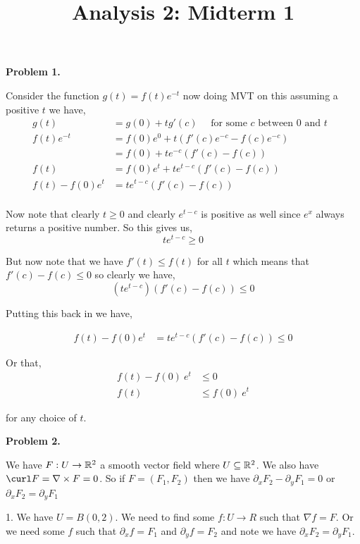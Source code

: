 \documentclass[a4paper]{article}
\title{Analysis 2: Midterm 1}
\begin{document}
\maketitle
\textbf{Problem 1.}

Consider the function $g(t) = f(t) e^{-t}$ now doing MVT on this assuming a positive $t$ we have,
\begin{align*}
    g(t) &= g(0) + t g'(c) \quad \text{ for some $c$ between $0$ and $t$ }\\
    f(t) e^{-t} &=  f(0) e^{0} + t (f'(c) e^{-c} - f(c) e^{-c})\\
 &= f(0) + t e^{-c} (f'(c) - f(c)) \\
 f(t) &= f(0)e^{t} + t e^{t-c} (f'(c) - f(c)) \\
 f(t)  -  f(0)e^{t}  &= t e^{t-c} (f'(c) - f(c)) \\
\end{align*}

Now note that clearly $t \ge 0$  and clearly $e^{t - c}$ is positive as well since $e^{x}$ always returns a positive number. So this gives us, 
\[
    t e^{t - c} \ge 0
\]

But now note that we have $f'(t) \le f(t)$ for all $t$ which means that $f'(c) - f(c) \le 0$ so clearly we have, 
\[
    (te^{t - c})(f'(c) - f(c)) \le 0
\]

Putting this back in we have, 

\begin{align*}
 f(t)  -  f(0)e^{t}  &= t e^{t-c} (f'(c) - f(c)) \le 0
\end{align*}

Or that, 
\begin{align*}
    f(t) - f(0) \ e^{t} &\le 0\\
    f(t) &\le f(0)\ e^{t}
\end{align*}

for any choice of $t$.


\textbf{Problem 2.}

We have $F:U \to \mathbb{R}^2$ a smooth vector field where $U \subseteq \mathbb{R}^2$. We also have $\curl F = \nabla \times F = 0$. So if $F= (F_{1}, F_{2})$ then we have $\partial_x F_{2} - \partial_y F_{1} = 0$ or $\partial_x F_{2} = \partial_y F_{1}$

\vspace{1em}

1. We have $U = B(0, 2)$. We need to find some $f:U \to R$  such that $\nabla f = F$. Or we need some $f$ such that $\partial_x f = F_{1}$ and $\partial_y f = F_{2}$ and note we have $\partial_x F_{2} = \partial_y F_{1}$. 
\end{document}
